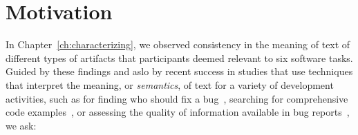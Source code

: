 
\section{Motivation}
\label{cp5:motivation}









In Chapter~\ref{ch:characterizing},
we observed consistency in the meaning of text of 
different types of artifacts that  
participants deemed relevant to six software tasks.
Guided by these findings and aslo by recent success 
in studies that use techniques that interpret the meaning, or \textit{semantics}, of text
for a variety of development activities, such as
for finding who should fix a bug~\cite{yang2016}, searching for comprehensive code examples~\cite{silva2019}, 
or assessing the quality of information available in bug reports~\cite{chaparro2019}, we ask:





